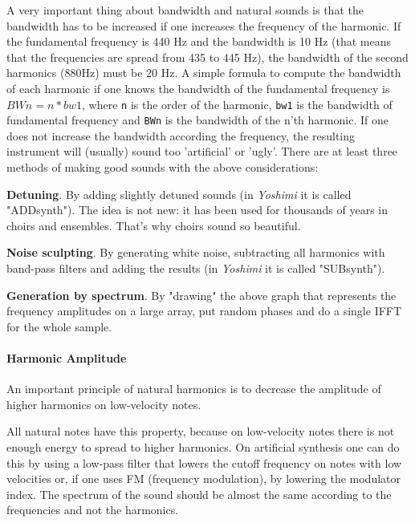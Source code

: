    A very important thing about bandwidth and natural sounds is that the
   bandwidth has to be increased if one increases the frequency of the
   harmonic.  If the fundamental frequency is 440 Hz and the bandwidth is 10
   Hz (that means that the frequencies are spread from 435 to 445 Hz), the
   bandwidth of the second harmonics (880Hz) must be 20 Hz. A simple formula
   to compute the bandwidth of each harmonic if one knows the bandwidth of the
   fundamental frequency is \(BWn = n*bw1\), where \texttt{n} is the
   order of the harmonic, \texttt{bw1} is the bandwidth of fundamental
   frequency and \texttt{BWn} is the bandwidth of the n'th harmonic. If one
   does not increase the bandwidth according the frequency, the resulting
   instrument will (usually) sound too 'artificial' or 'ugly'.  There
   are at least three methods of making good sounds with the above
   considerations: 

   \begin{enumber}
      \item \textbf{Detuning}.
      By adding slightly detuned sounds (in \textsl{Yoshimi}
      it is called "ADDsynth"). The idea is not new: it has been used
      for thousands of years in choirs and ensembles. That's why choirs
      sound so beautiful.
      \item \textbf{Noise sculpting}.
      By generating white noise, subtracting all harmonics with band-pass
      filters and adding the results (in \textsl{Yoshimi}
      it is called "SUBsynth").
      \item \textbf{Generation by spectrum}.
      By "drawing" the above graph that represents the frequency
      amplitudes on a large array, put random phases and do a single
      IFFT for the whole sample.
   \end{enumber}

\paragraph{Harmonic Amplitude}
\label{paragraph:concepts_basics_harmonic_amplitude}

   An important principle of natural harmonics is to decrease the amplitude
   of higher harmonics on low-velocity notes.

   All natural notes have this property, because on low-velocity notes there
   is not enough energy to spread to higher harmonics. On artificial
   synthesis one can do this by using a low-pass filter that lowers the
   cutoff frequency on notes with low velocities or, if one uses FM
   (frequency modulation), by lowering the modulator index. 
   The spectrum of the sound should be almost the same according to
   the frequencies and not the harmonics.


